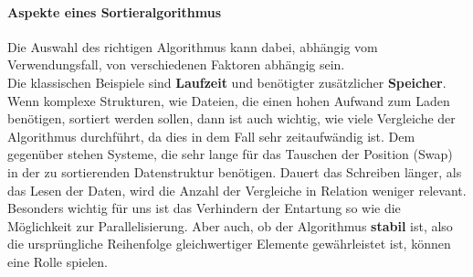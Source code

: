 		\paragraph{Aspekte eines Sortieralgorithmus}
			Die Auswahl des richtigen Algorithmus kann dabei, abhängig vom Verwendungsfall, von verschiedenen Faktoren abhängig sein.\\
			Die klassischen Beispiele sind \textbf{Laufzeit} und benötigter zusätzlicher \textbf{Speicher}.
			Wenn komplexe Strukturen, wie Dateien, die einen hohen Aufwand zum Laden benötigen, sortiert werden sollen, dann ist auch wichtig, wie viele Vergleiche der Algorithmus durchführt, da dies in dem Fall sehr zeitaufwändig ist.
			Dem gegenüber stehen Systeme, die sehr lange für das Tauschen der Position (Swap) in der zu sortierenden Datenstruktur benötigen.
			Dauert das Schreiben länger, als das Lesen der Daten, wird die Anzahl der Vergleiche in Relation weniger relevant.\\
			Besonders wichtig für uns ist das Verhindern der Entartung so wie die Möglichkeit zur Parallelisierung.
			Aber auch, ob der Algorithmus \textbf{stabil} ist, also die ursprüngliche Reihenfolge gleichwertiger Elemente gewährleistet ist, können eine Rolle spielen.\\
			

